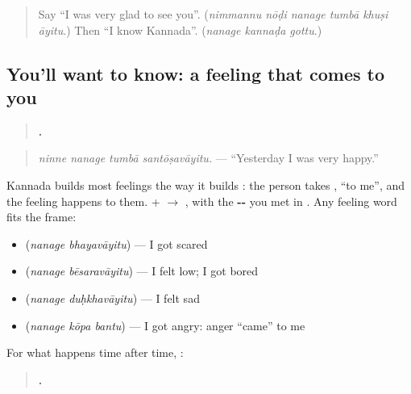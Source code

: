\label{lesson:KA-C315-santosavayitu}



\begin{quote}
Say \textquotedblleft{}I was very glad to see you\textquotedblright{}. (\emph{nimmannu nōḍi nanage tumbā khuṣi āyitu}.) Then \textquotedblleft{}I know Kannada\textquotedblright{}. (\emph{nanage kannaḍa gottu}.)
\end{quote}

\subsection*{You'll want to know: a feeling that comes to you}
\begin{quote}
\textbf{   .}
\end{quote}

\begin{quote}
\emph{ninne nanage tumbā santōṣavāyitu.} — \textquotedblleft{}Yesterday I was very happy.\textquotedblright{}
\end{quote}

Kannada builds most feelings the way it builds \textbf{  }: the person takes \textbf{}, \textquotedblleft{}to me\textquotedblright{}, and the feeling happens to them. \textbf{} + \textbf{} $\to$ \textbf{}, with the \textbf{--} you met in \textbf{}. Any feeling word fits the frame:

\begin{itemize}
\raggedright
  \item \textbf{ } (\emph{nanage bhayavāyitu}) — I got scared
  \item \textbf{ } (\emph{nanage bēsaravāyitu}) — I felt low; I got bored
  \item \textbf{ } (\emph{nanage duḥkhavāyitu}) — I felt sad
  \item \textbf{  } (\emph{nanage kōpa bantu}) — I got angry: anger \textquotedblleft{}came\textquotedblright{} to me
\end{itemize}

For what happens time after time, \textbf{}:

\begin{quote}
\textbf{  .}
\end{quote}

